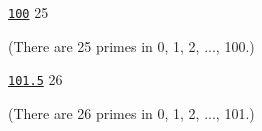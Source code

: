 

\resett
\nextt
\begin{console}[commandchars=\\\{\}]
\underline{\texttt{100}}
25
\end{console}
(There are 25 primes in 0, 1, 2, ..., 100.)

\nextt
\begin{console}[commandchars=\\\{\}]
\underline{\texttt{101.5}}
26
\end{console}
(There are 26 primes in 0, 1, 2, ..., 101.)

